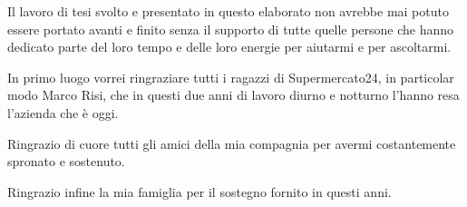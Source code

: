 Il lavoro di tesi svolto e presentato in questo elaborato non avrebbe mai potuto essere portato avanti e finito senza il supporto di tutte quelle persone che hanno dedicato parte del loro tempo e delle loro energie per aiutarmi e per ascoltarmi.

In primo luogo vorrei ringraziare tutti i ragazzi di Supermercato24, in particolar modo Marco Risi, che in questi due anni di lavoro diurno e notturno l'hanno resa l'azienda che è oggi.

Ringrazio di cuore tutti gli amici della mia compagnia per avermi costantemente spronato e sostenuto.

Ringrazio infine la mia famiglia per il sostegno fornito in questi anni.
